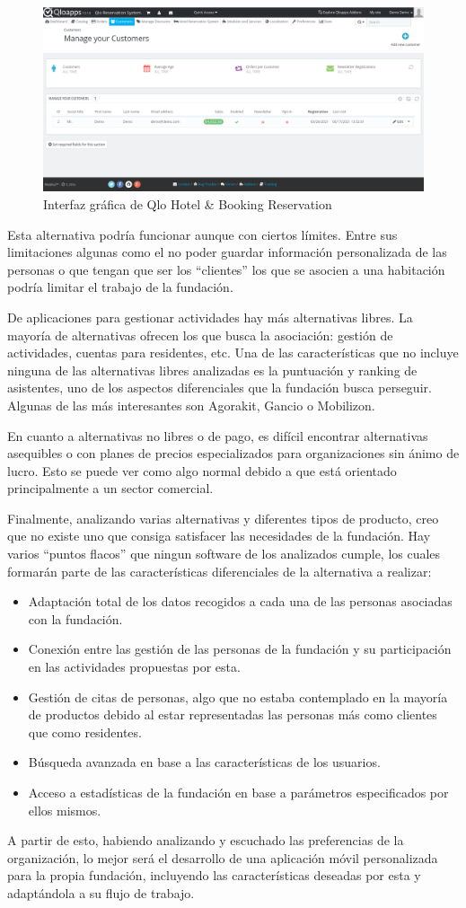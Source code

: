 \begin{figure}[htbp]
    \centerline{\includegraphics[scale=.5]{imagenes/estado_arte/qlo.png}}
    \caption{Interfaz gráfica de Qlo Hotel \& Booking Reservation}
    \label{fig}
\end{figure}

Esta alternativa podría funcionar aunque con ciertos límites. Entre sus limitaciones algunas como el no poder guardar información personalizada de las personas o que tengan que ser los ``clientes'' los que se asocien a una habitación podría limitar el trabajo de la fundación.

De aplicaciones para gestionar actividades hay más alternativas libres. La mayoría de alternativas ofrecen los que busca la asociación: gestión de actividades, cuentas para residentes, etc. Una de las características que no incluye ninguna de las alternativas libres analizadas es la puntuación y ranking de asistentes, uno de los aspectos diferenciales que la fundación busca perseguir. Algunas de las más interesantes son Agorakit, Gancio o Mobilizon.

En cuanto a alternativas no libres o de pago, es difícil encontrar alternativas asequibles o con planes de precios especializados para organizaciones sin ánimo de lucro. Esto se puede ver como algo normal debido a que está orientado principalmente a un sector comercial.

Finalmente, analizando varias alternativas y diferentes tipos de producto, creo que no existe uno que consiga satisfacer las necesidades de la fundación. Hay varios ``puntos flacos'' que ningun software de los analizados cumple, los cuales formarán parte de las características diferenciales de la alternativa a realizar:

\begin{itemize}
    \item Adaptación total de los datos recogidos a cada una de las personas asociadas con la fundación.
    \item Conexión entre las gestión de las personas de la fundación y su participación en las actividades propuestas por esta.
    \item Gestión de citas de personas, algo que no estaba contemplado en la mayoría de productos debido al estar representadas las personas más como clientes que como residentes.
    \item Búsqueda avanzada en base a las características de los usuarios.
    \item Acceso a estadísticas de la fundación en base a parámetros especificados por ellos mismos.
\end{itemize}

A partir de esto, habiendo analizando y escuchado las preferencias de la organización, lo mejor será el desarrollo de una aplicación móvil personalizada para la propia fundación, incluyendo las características deseadas por esta y adaptándola a su flujo de trabajo.